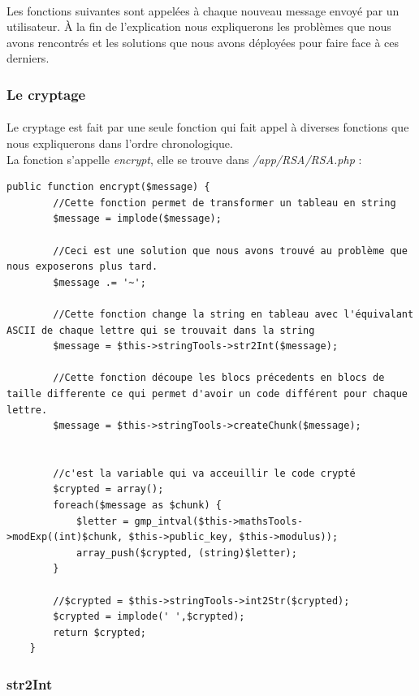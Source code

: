\documentclass[12pt,a4paper]{report}
\begin{document}
\begin{itemize}
\paragraph{} Les fonctions suivantes sont appelées à chaque nouveau message envoyé par un utilisateur. À la fin de l'explication nous expliquerons les problèmes que nous avons rencontrés et les solutions que nous avons déployées pour faire face à ces derniers.
\subsubsection{Le cryptage}
\paragraph{} Le cryptage est fait par une seule fonction qui fait appel à diverses fonctions que nous expliquerons dans l'ordre chronologique.\\
La fonction s'appelle \textit{encrypt}, elle se trouve dans \textit{/app/RSA/RSA.php} :
\begin{lstlisting}
public function encrypt($message) {
        //Cette fonction permet de transformer un tableau en string
        $message = implode($message);
        
        //Ceci est une solution que nous avons trouvé au problème que nous exposerons plus tard.
        $message .= '~';
        
        //Cette fonction change la string en tableau avec l'équivalant ASCII de chaque lettre qui se trouvait dans la string
        $message = $this->stringTools->str2Int($message);
        
        //Cette fonction découpe les blocs précedents en blocs de taille differente ce qui permet d'avoir un code différent pour chaque lettre.
        $message = $this->stringTools->createChunk($message);
        
        
        //c'est la variable qui va acceuillir le code crypté
        $crypted = array();
        foreach($message as $chunk) {
            $letter = gmp_intval($this->mathsTools->modExp((int)$chunk, $this->public_key, $this->modulus));
            array_push($crypted, (string)$letter);
        }
        
        //$crypted = $this->stringTools->int2Str($crypted);
        $crypted = implode(' ',$crypted);
        return $crypted;
    }
\end{lstlisting}
\subsubsection{str2Int}

\end{itemize}
\end{document}
